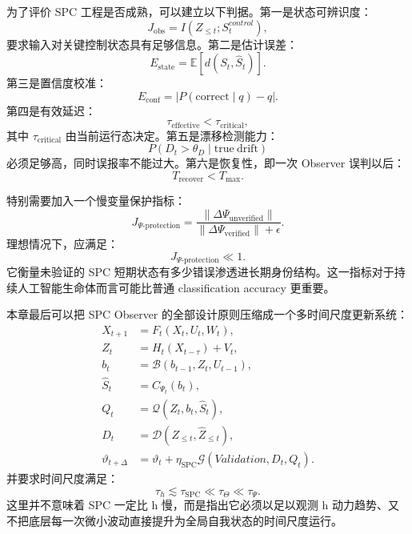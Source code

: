 为了评价 SPC 工程是否成熟，可以建立以下判据。第一是状态可辨识度：
\begin{equation}
J_{\mathrm{obs}}
=
I(Z_{\leq t};S_t^{control}),
\end{equation}
要求输入对关键控制状态具有足够信息。第二是估计误差：
\begin{equation}
E_{\mathrm{state}}
=
\mathbb E
\left[
d(S_t,\hat S_t)
\right].
\end{equation}
第三是置信度校准：
\begin{equation}
E_{\mathrm{conf}}
=
\left|
P(\mathrm{correct}\mid q)-q
\right|.
\end{equation}
第四是有效延迟：
\begin{equation}
\tau_{\mathrm{effective}}
<
\tau_{\mathrm{critical}},
\end{equation}
其中 $\tau_{\mathrm{critical}}$ 由当前运行态决定。第五是漂移检测能力：
\begin{equation}
P
\left(
D_t>\theta_D
\mid
\mathrm{true\ drift}
\right)
\end{equation}
必须足够高，同时误报率不能过大。第六是恢复性，即一次 Observer 误判以后：
\begin{equation}
T_{\mathrm{recover}}
< T_{\max}.
\end{equation}

特别需要加入一个慢变量保护指标：
\begin{equation}
J_{\Psi\text{-protection}}
=
\frac{
\|\Delta\Psi_{\mathrm{unverified}}\|
}{
\|\Delta\Psi_{\mathrm{verified}}\|+\epsilon
}.
\end{equation}
理想情况下，应满足：
\begin{equation}
J_{\Psi\text{-protection}}
\ll1.
\end{equation}
它衡量未验证的 SPC 短期状态有多少错误渗透进长期身份结构。这一指标对于持续人工智能生命体而言可能比普通 classification accuracy 更重要。

本章最后可以把 SPC Observer 的全部设计原则压缩成一个多时间尺度更新系统：
\begin{align}
X_{t+1}
&=
F_t(X_t,U_t,W_t),\\
Z_t
&=
H_t(X_{t-\tau})+V_t,\\
b_t
&=
\mathcal B
\left(
b_{t-1},Z_t,U_{t-1}
\right),\\
\hat S_t
&=
C_{\Psi_t}(b_t),\\
Q_t
&=
\mathcal Q
\left(
Z_t,b_t,\hat S_t
\right),\\
D_t
&=
\mathcal D
\left(
Z_{\leq t},
\hat Z_{\leq t}
\right),\\
\vartheta_{t+\Delta}
&=
\vartheta_t
+
\eta_{\mathrm{SPC}}
\mathcal G
\left(
Validation,
D_t,
Q_t
\right).
\end{align}
并要求时间尺度满足：
\begin{equation}
\boxed{
\tau_h
\lesssim
\tau_{\mathrm{SPC}}
\ll
\tau_{\Theta}
\ll
\tau_{\Psi}.
}
\end{equation}
这里并不意味着 SPC 一定比 h 慢，而是指出它必须以足以观测 h 动力趋势、又不把底层每一次微小波动直接提升为全局自我状态的时间尺度运行。

